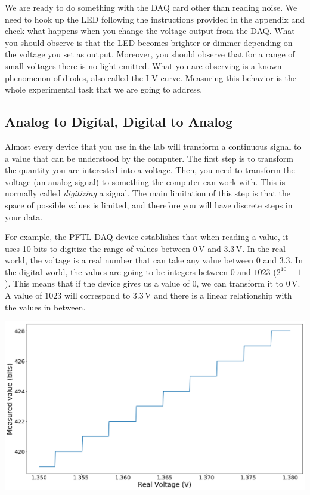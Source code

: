 We are ready to do something with the {DAQ} card
other than reading noise. We need to hook up the {LED} following the instructions provided in the appendix and check what happens when you change the voltage output from the
{DAQ}. What you should observe is that the LED becomes brighter or dimmer depending on the voltage
you set as output. Moreover, you
should observe that for a range of small voltages there is no light emitted. What you are observing is a known phenomenon of diodes, also called the I-V curve. Measuring this behavior is the whole experimental task that we are going to address.

\subsection{Analog to Digital, Digital to Analog}
Almost every device that you use in the lab will transform a continuous signal to a value that can be understood by the computer. The first step is to transform the quantity you are interested into a voltage. Then, you need to transform the voltage (an analog signal) to something the computer can work with. This is normally called \emph{digitizing} a signal. The main limitation of this step is that the space of possible values is limited, and therefore you will have discrete steps in your data. 

For example, the {PFTL DAQ} device establishes that when reading a value, it uses 10 bits to digitize the range of values between $0\,\textrm{V}$ and $3.3\,\textrm{V}$. In the real world, the voltage is a real number that can take any value between $0$ and $3.3$. In the digital world, the values are going to be integers between $0$ and $1023$ ($2^{10}-1$). This means that if the device gives us a value of $0$, we can transform it to $0\,\textrm{V}$. A value of $1023$ will correspond to $3.3\,\textrm{V}$ and there is a linear relationship with the values in between. 

\begin{center}
\includegraphics[width=.6\textwidth]{images/Chapter_03/digitalization.png}
\end{center}

